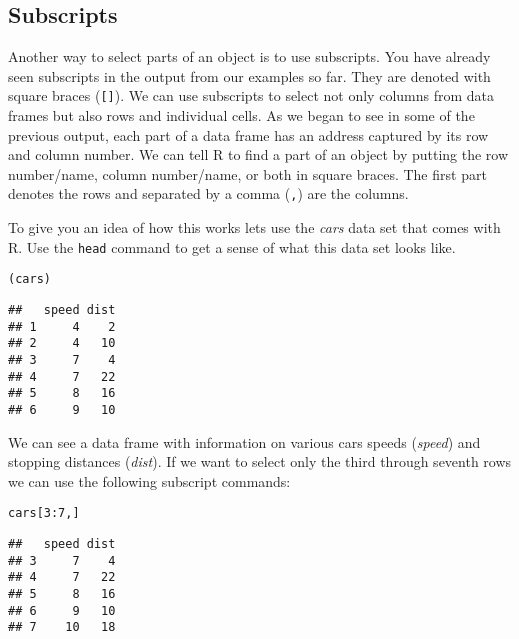 \subsection{Subscripts}

Another way to select parts of an object is to use subscripts. You have already seen subscripts in the output from our examples so far. They are denoted with square braces (\texttt{[]}). We can use subscripts to select not only columns from data frames but also rows and individual cells. As we began to see in some of the previous output, each part of a data frame has an address captured by its row and column number. We can tell R to find a part of an object by putting the row number/name, column number/name, or both in square braces. The first part denotes the rows and separated by a comma (\texttt{,}) are the columns. 

To give you an idea of how this works lets use the {\emph{cars}} data set that comes with R. Use the \texttt{head} command to get a sense of what this data set looks like.

\begin{knitrout}
\color{fgcolor}\begin{kframe}
\begin{alltt}
(cars)
\end{alltt}
\begin{verbatim}
##   speed dist
## 1     4    2
## 2     4   10
## 3     7    4
## 4     7   22
## 5     8   16
## 6     9   10
\end{verbatim}
\end{kframe}
\end{knitrout}


\noindent We can see a data frame with information on various cars speeds ({\emph{speed}}) and stopping distances ({\emph{dist}}). If we want to select only the third through seventh rows we can use the following subscript commands:

\begin{knitrout}
\color{fgcolor}\begin{kframe}
\begin{alltt}
cars[3:7, ]
\end{alltt}
\begin{verbatim}
##   speed dist
## 3     7    4
## 4     7   22
## 5     8   16
## 6     9   10
## 7    10   18
\end{verbatim}
\end{kframe}
\end{knitrout}


